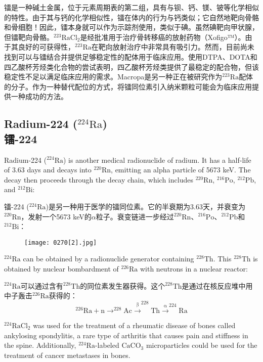 \documentclass[dvipsnames, svgnames,a4paper,11pt]{article}
\begin{document}
镭是一种碱土金属，位于元素周期表的第二组，具有与钡、钙、镁、铍等化学相似的特性。由于其与钙的化学相似性，镭在体内的行为与钙类似；它自然地靶向骨骼和骨细胞！因此，镭本身就可以作为示踪剂使用，类似于碘。虽然碘靶向甲状腺，但镭靶向骨骼。\(\mathrm{^{223}RaCl_2}\)是经批准用于治疗骨转移癌的放射药物（Xofigo™）。由于其良好的可获得性，\(\mathrm{^{223}Ra}\)在靶向放射治疗中非常具有吸引力。然而，目前尚未找到可以与镭结合并提供足够稳定性的配体用于临床应用。使用DTPA、DOTA和四乙酸杯芳烃类化合物的尝试表明，四乙酸杯芳烃类提供了最稳定的配合物，但该稳定性不足以满足临床应用的需求。Macropa是另一种正在被研究作为\(\mathrm{^{223}Ra}\)配体的分子。作为一种替代配位的方式，将镭同位素引入纳米颗粒可能会为临床应用提供一种成功的方法。

\subsection{Radium-224 (\(\mathrm{^{224}Ra}\)) \\镭-224}  
Radium-224 (\(\mathrm{^{224}Ra}\)) is another medical radionuclide of radium. It has a half-life of 3.63 days and decays into \(\mathrm{^{220}Rn}\), emitting an alpha particle of 5673 keV. The decay then proceeds through the decay chain, which includes \(\mathrm{^{220}Rn}\), \(\mathrm{^{216}Po}\), \(\mathrm{^{212}Pb}\), and \(\mathrm{^{212}Bi}\):

镭-224 (\(\mathrm{^{224}Ra}\))是另一种用于医学的镭同位素。它的半衰期为3.63天，并衰变为\(\mathrm{^{220}Rn}\)，发射一个5673 keV的$\alpha$粒子。衰变链进一步经过\(\mathrm{^{220}Rn}\)、\(\mathrm{^{216}Po}\)、\(\mathrm{^{212}Pb}\)和\(\mathrm{^{212}Bi}\)：  

\begin{figure}[h]
	\centering
    \texttt{[image: 0270[2].jpg]}  
     \label{fig365}
\end{figure}


\(\mathrm{^{224}Ra}\) can be obtained by a radionuclide generator containing \(\mathrm{^{228}Th}\). This \(\mathrm{^{228}Th}\) is obtained by nuclear bombardment of \(\mathrm{^{226}Ra}\) with neutrons in a nuclear reactor:

\(\mathrm{^{224}Ra}\)可以通过含有\(\mathrm{^{228}Th}\)的同位素发生器获得。这个\(\mathrm{^{228}Th}\)是通过在核反应堆中用中子轰击\(\mathrm{^{226}Ra}\)获得的：
\[
\mathrm{^{226}Ra + n \to ^{228}Ac \xrightarrow{\beta} ^{228}Th \xrightarrow{\alpha} ^{224}Ra}
\]

\(\mathrm{^{224}RaCl_2}\) was used for the treatment of a rheumatic disease of bones called ankylosing spondylitis, a rare type of arthritis that causes pain and stiffness in the spine. Additionally, \(\mathrm{^{224}Ra}\)-labeled \(\mathrm{CaCO_3}\) microparticles could be used for the treatment of cancer metastases in bones.
\end{document}
